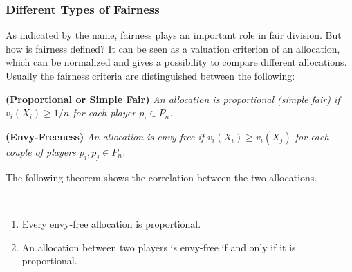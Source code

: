 \subsubsection{Different Types of Fairness}
As indicated by the name, fairness plays an important role in fair division. But how is fairness defined? It can be seen as a valuation criterion of an allocation, which can be normalized and gives a possibility to compare different allocations. Usually the fairness criteria are distinguished between the following:
\begin{defi}{\textbf{(Proportional or Simple Fair)}}
\newline \emph{An allocation is \emph{proportional (simple fair)} if
$v_i(X_i) \geq 1/n$ for each player $p_i \in P_n$.}
\end{defi}
\begin{defi}{\textbf{(Envy-Freeness)}}
\newline \emph{An allocation is \emph{envy-free} if $v_i(X_i) \geq
v_i(X_j)$ for each couple of players $p_i, p_j \in P_n$.}
\end{defi}
\vsp
%
%
The following theorem shows the correlation between the two allocations.
%
\begin{lem}
\textcolor{white}{x}
\begin{enumerate}
\item Every envy-free allocation is proportional.
\item An allocation between two players is envy-free if and only if it is proportional.
\end{enumerate}
\end{lem}
